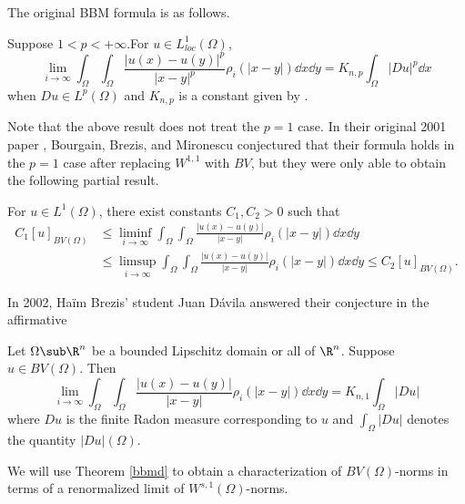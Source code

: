 \documentclass[../main.tex]{subfiles}
\begin{document}
The original BBM formula is as follows. 
\begin{theorem}\label{bbm}
    Suppose $ 1< p <+\infty $.For $ u\in L^{1}_{loc}(\Omega) $,
    \[
        \lim_{i\to\infty} \int_{\Omega}\int_{\Omega} \frac{|u(x)-u(y)|^{p}}{|x-y|^{p}} \rho_{i}(|x-y|)\dd{x} \dd{y} = K_{n,p}\int_{\Omega}| Du|^{p} \dd{x}
    \]
    when $ Du\in L^{p}(\Omega) $ and $ K_{n,p} $ is a constant given by . 
\end{theorem}
Note that the above result does not treat the $ p=1 $ case. In their original 2001 paper \cite{brezis:2001}, Bourgain, Brezis, and Mironescu conjectured that their formula holds in the $ p=1 $ case after replacing $ W^{1,1} $ with $ BV $, but they were only able to obtain the following partial result.
\begin{theorem}
    For $ u\in L^1(\Omega) $, there exist constants $ C_{1}, C_{2}>0  $ such that 
    \begin{align*}
        C_{1} [u]_{BV(\Omega)} &\leq  \liminf_{i\to\infty} \int_{\Omega}\int_{\Omega} \frac{|u(x)-u(y)|}{|x-y|} \rho_{i}(|x-y|)\dd{x} \dd{y} \\
        &\leq \limsup_{i\to\infty} \int_{\Omega}\int_{\Omega} \frac{|u(x)-u(y)|}{|x-y|} \rho_{i}(|x-y|)\dd{x} \dd{y} \leq C_{2}[u]_{BV(\Omega)}.
    \end{align*}
\end{theorem}
In 2002, Ha\"im Brezis' student Juan D\'avila \cite{davila:2002} answered their conjecture in the affirmative 

\begin{theorem}\label{bbmd}
    Let $ \Omega\sub \R^{n} $ be a bounded Lipschitz domain or all of $ \R^{n} $. Suppose $ u\in BV(\Omega) $. Then
    \[
        \lim_{i\to\infty} \int_{\Omega}\int_{\Omega} \frac{|u(x)-u(y)|}{|x-y|} \rho_{i}(|x-y|)\dd{x} \dd{y} = K_{n,1}\int_{\Omega}| Du|
    \]
    where $ Du $ is the finite Radon measure corresponding to $ u $ and $ \int_{\Omega} |Du| $ denotes the quantity $ |Du |(\Omega) $.
\end{theorem}

We will use Theorem \ref{bbmd} to obtain a characterization of $ BV(\Omega) $-norms in terms of a renormalized limit of $ W^{s,1}(\Omega) $-norms.
\end{document}
